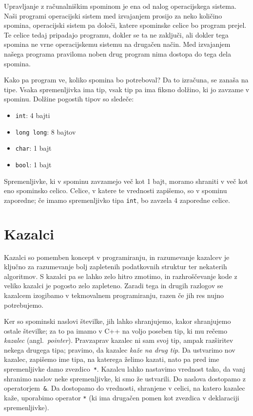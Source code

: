 \documentclass{book}
\begin{document}
Upravljanje z računalniškim spominom je ena od nalog operacijskega sistema.
Naši programi operacijski sistem med izvajanjem prosijo za neko količino spomina,
operacijski sistem pa določi, katere spominske celice bo program prejel.
Te celice tedaj pripadajo programu, dokler se ta ne zaključi, ali dokler tega
spomina ne vrne operacijskemu sistemu na drugačen način. Med izvajanjem
našega programa praviloma noben drug program nima dostopa do tega dela
spomina.

Kako pa program ve, koliko spomina bo potreboval? Da to izračuna, se zanaša
na tipe. Vsaka spremenljivka ima tip, vsak tip pa ima fiksno dolžino, ki jo
zavzame v spominu. Dolžine pogostih tipov so sledeče:
\begin{itemize}
  \item \verb+int+: 4 bajti
  \item \verb+long long+: 8 bajtov
  \item \verb+char+: 1 bajt
  \item \verb+bool+: 1 bajt
\end{itemize}
Spremenljivke, ki v spominu zavzamejo več kot 1 bajt, moramo shraniti v več
kot eno spominsko celico. Celice, v katere te vrednosti zapišemo, so v spominu
zaporedne; če imamo spremenljivko tipa \verb+int+, bo zavzela 4 zaporedne celice.

\section{Kazalci}

\begin{errors}
  Kazalci so pomemben koncept v programiranju, in razumevanje kazalcev je ključno
  za razumevanje bolj zapletenih podatkovnih struktur ter nekaterih algoritmov.
  S kazalci pa se lahko zelo hitro zmotimo, in razhroščevanje kode z veliko
  kazalci je pogosto zelo zapleteno. Zaradi tega in drugih razlogov
  se kazalcem izogibamo v tekmovalnem programiranju, razen če jih res nujno
  potrebujemo.
\end{errors}

Ker so spominski naslovi številke, jih lahko shranjujemo, kakor shranjujemo
ostale številke; za to pa imamo v C++ na voljo poseben tip, ki mu rečemo
\emph{kazalec} (angl.~\textit{pointer}).
Pravzaprav kazalec ni sam svoj tip, ampak razširitev nekega drugega tipa;
pravimo, da kazalec \emph{kaže na drug tip}.
Da ustvarimo nov kazalec, zapišemo ime tipa, na katerega želimo kazati,
nato pa pred ime spremenljivke damo zvezdico~\verb+*+.
Kazalcu lahko nastavimo vrednost tako, da vanj shranimo naslov neke
spremenljivke, ki smo že ustvarili. Do naslova dostopamo z operatorjem~\verb+&+.
Da dostopamo do vrednosti, shranjene v celici, na katero kazalec kaže,
uporabimo operator \verb+*+ (ki ima drugačen pomen kot zvezdica v deklaraciji
spremenljivke).
\end{document}
